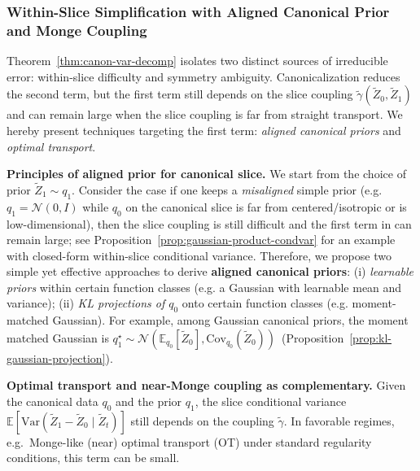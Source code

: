 \documentclass{article}
\theoremstyle{plain}
\theoremstyle{definition}
\theoremstyle{remark}
\newcommand{\1}{\mathbf{1}}
\begin{document}
\subsubsection{Within-Slice Simplification with Aligned Canonical Prior and Monge Coupling}\label{subsubsec:align_ot}
Theorem~\ref{thm:canon-var-decomp} isolates two distinct sources of irreducible error: within-slice difficulty and symmetry ambiguity.
Canonicalization reduces the second term, but the first term still depends on the slice coupling $\tilde \gamma(\tilde Z_0, \tilde Z_1)$ and can remain large when the slice coupling is far from straight transport. We hereby present techniques targeting the first term: \emph{aligned canonical priors} and \emph{optimal transport}. 

\textbf{Principles of aligned prior for canonical slice.}
We start from the choice of prior $\tilde Z_1\sim q_1$. Consider the case if one keeps a \emph{misaligned} simple prior (e.g.\ $q_1=\mathcal{N}(0,I)$ while $q_0$ on the canonical slice is far from centered/isotropic or is low-dimensional), then the slice coupling is still difficult and the first term in  can remain large; see Proposition~\ref{prop:gaussian-product-condvar} for an example with closed-form within-slice conditional variance.
Therefore, we propose two simple yet effective approaches to derive \textbf{aligned canonical priors}:
(i) \emph{learnable priors} within certain function classes (e.g. a Gaussian with learnable mean and variance); (ii) \emph{KL projections of $q_0$} onto certain function classes (e.g. moment-matched Gaussian). For example, among Gaussian canonical priors, the moment matched Gaussian is $q_1^\star\sim\mathcal N(\mathbb{E}_{q_0}[\widetilde Z_0], \mathrm{Cov}_{q_0}(\widetilde Z_0))$~(Proposition~\ref{prop:kl-gaussian-projection}).

\textbf{Optimal transport and near-Monge coupling as complementary.}
Given the canonical data $q_0$ and the prior $q_1$, the slice conditional variance $\mathbb{E}[\mathrm{Var}(\widetilde Z_1-\widetilde Z_0\mid \widetilde Z_t)]$ still depends on the coupling $\tilde \gamma$. In favorable regimes, e.g.\ Monge-like (near) optimal transport (OT) under standard regularity conditions, this term can be small.
\end{document}

